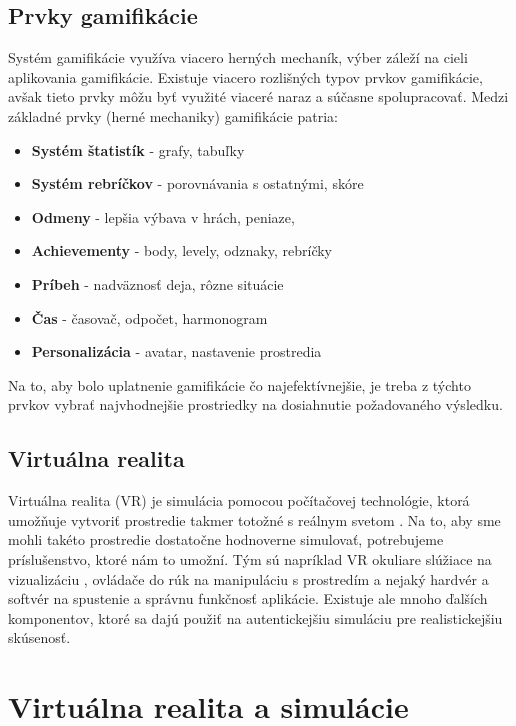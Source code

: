 \documentclass[10pt,slovak,a4paper]{article}
\begin{document}
\subsection{Prvky gamifikácie} \label{Prvky.gamifikacie}

Systém gamifikácie využíva viacero herných mechaník, výber záleží na cieli aplikovania gamifikácie. Existuje viacero rozlišných typov prvkov gamifikácie, avšak tieto prvky môžu byť využité viaceré naraz a súčasne spolupracovať. Medzi základné prvky (herné mechaniky) gamifikácie patria: \cite{Jackson} 
\begin{itemize}
\item \textbf{Systém štatistík} - grafy, tabuľky
\item \textbf{Systém rebríčkov} - porovnávania s ostatnými, skóre
\item \textbf{Odmeny} - lepšia výbava v hrách, peniaze, 
\item \textbf{Achievementy} - body, levely, odznaky, rebríčky
\item \textbf{Príbeh} - nadväznosť deja, rôzne situácie 
\item \textbf{Čas} - časovač, odpočet, harmonogram
\item \textbf{Personalizácia} - avatar, nastavenie prostredia

\end{itemize}
Na to, aby bolo uplatnenie gamifikácie čo najefektívnejšie, je treba z týchto prvkov vybrať najvhodnejšie prostriedky na dosiahnutie požadovaného výsledku.

\subsection{Virtuálna realita} \label{Virtualna.realita.vysvetlennie}

Virtuálna realita (VR) je simulácia pomocou počítačovej technológie, ktorá umožňuje vytvoriť prostredie takmer totožné s reálnym svetom \cite{Pantelidis}. Na to, aby sme mohli takéto prostredie dostatočne hodnoverne simulovať, potrebujeme príslušenstvo, ktoré nám to umožní. Tým sú napríklad VR okuliare slúžiace na vizualizáciu , ovládače do rúk na manipuláciu s prostredím a nejaký hardvér a softvér na spustenie a správnu funkčnosť aplikácie. Existuje ale mnoho ďalších komponentov, ktoré sa dajú použiť na autentickejšiu simuláciu pre realistickejšiu skúsenosť. 


\section{Virtuálna realita a simulácie} \label{Virtualna.realita.a.simulacie}
\end{document}
